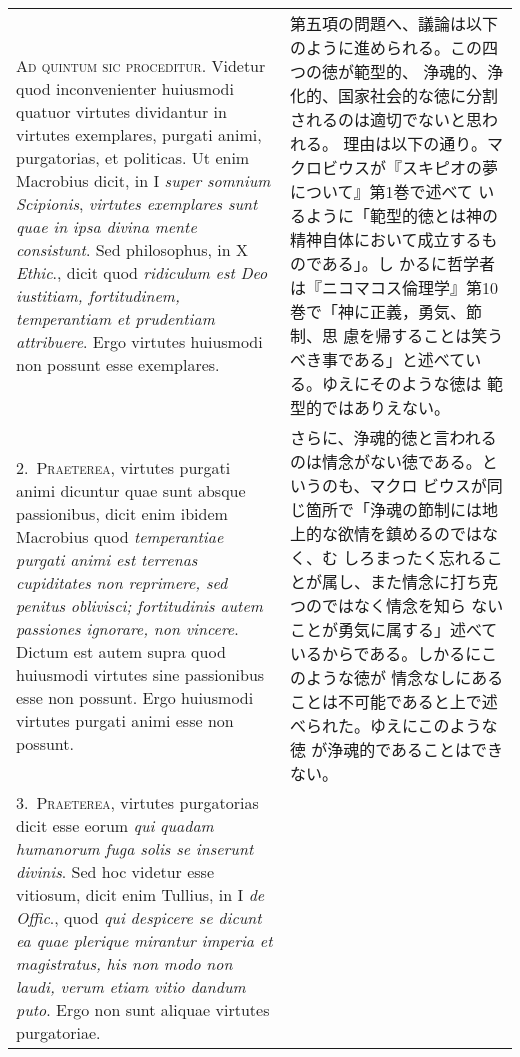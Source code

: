 \documentclass[10pt]{jsarticle}
\begin{document}
\begin{longtable}{p{21em}p{21em}}
{\scshape Ad quintum sic proceditur}. Videtur quod inconvenienter
huiusmodi quatuor virtutes dividantur in virtutes exemplares, purgati
animi, purgatorias, et politicas. Ut enim Macrobius dicit, in I
{\itshape super somnium Scipionis}, {\itshape virtutes exemplares sunt
quae in ipsa divina mente consistunt}. Sed philosophus, in X {\itshape
Ethic}., dicit quod {\itshape ridiculum est Deo iustitiam,
fortitudinem, temperantiam et prudentiam attribuere}. Ergo virtutes
huiusmodi non possunt esse exemplares.

&

 第五項の問題へ、議論は以下のように進められる。この四つの徳が範型的、
 浄魂的、浄化的、国家社会的な徳に分割されるのは適切でないと思われる。
 理由は以下の通り。マクロビウスが『スキピオの夢について』第1巻で述べて
 いるように「範型的徳とは神の精神自体において成立するものである」。し
 かるに哲学者は『ニコマコス倫理学』第10巻で「神に正義，勇気、節制、思
 慮を帰することは笑うべき事である」と述べている。ゆえにそのような徳は
 範型的ではありえない。
 
\\

2.~{\scshape Praeterea}, virtutes purgati animi dicuntur quae sunt
absque passionibus, dicit enim ibidem Macrobius quod {\itshape
temperantiae purgati animi est terrenas cupiditates non reprimere, sed
penitus oblivisci; fortitudinis autem passiones ignorare, non
vincere}. Dictum est autem supra quod huiusmodi virtutes sine
passionibus esse non possunt. Ergo huiusmodi virtutes purgati animi
esse non possunt.

&

 さらに、浄魂的徳と言われるのは情念がない徳である。というのも、マクロ
 ビウスが同じ箇所で「浄魂の節制には地上的な欲情を鎮めるのではなく、む
 しろまったく忘れることが属し、また情念に打ち克つのではなく情念を知ら
 ないことが勇気に属する」述べているからである。しかるにこのような徳が
 情念なしにあることは不可能であると上で述べられた。ゆえにこのような徳
 が浄魂的であることはできない。

 
\\



3.~{\scshape Praeterea}, virtutes purgatorias dicit esse eorum
{\itshape qui quadam humanorum fuga solis se inserunt divinis}. Sed
hoc videtur esse vitiosum, dicit enim Tullius, in I {\itshape de
Offic}., quod {\itshape qui despicere se dicunt ea quae plerique
mirantur imperia et magistratus, his non modo non laudi, verum etiam
vitio dandum puto}. Ergo non sunt aliquae virtutes purgatoriae.


\end{longtable}
\end{document}
